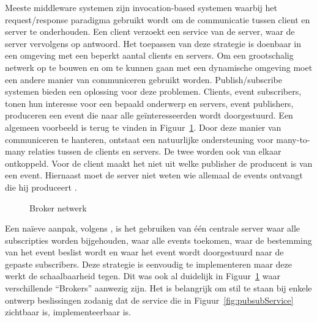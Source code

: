 Meeste middleware systemen zijn invocation-based systemen waarbij het request/response paradigma gebruikt wordt om de communicatie tussen client en server te onderhouden.
Een client verzoekt een service van de server, waar de server vervolgens op antwoord.
Het toepassen van deze strategie is doenbaar in een omgeving met een beperkt aantal clients en servers.
Om een grootschalig netwerk op te bouwen en om te kunnen gaan met een dynamische omgeving moet een andere manier van communiceren gebruikt worden.
Publish/subscribe systemen bieden een oplossing voor deze problemen.
Clients, event subscribers, tonen hun interesse voor een bepaald onderwerp en servers, event publishers, produceren een event die naar alle geïnteresseerden wordt doorgestuurd.
Een algemeen voorbeeld is terug te vinden in Figuur~\ref{fig:pubsubArchi}.
Door deze manier van communiceren te hanteren, ontstaat een natuurlijke ondersteuning voor many-to-many relaties tussen de clients en servers.
De twee worden ook van elkaar ontkoppeld.
Voor de client maakt het niet uit welke publisher de producent is van een event.
Hiernaast moet de server niet weten wie allemaal de events ontvangt die hij produceert \citep{pietzuch2002hermes}.

\begin{figure}[!ht]
\centering
{}
\caption{Broker netwerk \citep{pietzuch2002hermes}}
\label{fig:pubsubArchi}
\end{figure}

Een naïeve aanpak, volgens \citet{carzaniga2001design}, is het gebruiken van één centrale server waar alle subscripties worden bijgehouden, waar alle events toekomen, waar de bestemming van het event beslist wordt en waar het event wordt doorgestuurd naar de gepaste subscribers.
Deze strategie is eenvoudig te implementeren maar deze werkt de schaalbaarheid tegen.
Dit was ook al duidelijk in Figuur~\ref{fig:pubsubArchi} waar verschillende ``Brokers'' aanwezig zijn.
Het is belangrijk om stil te staan bij enkele ontwerp beslissingen zodanig dat de service die in Figuur~\ref{fig:pubsubService} zichtbaar is, implementeerbaar is.

